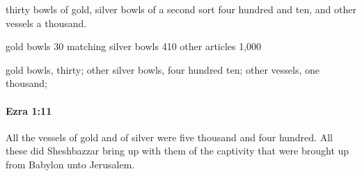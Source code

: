 			\begin{versebox}
					\item[BHS] 
					\item[LXX] 
					\item[ASV] thirty bowls of gold, silver bowls of a second sort four hundred and ten, and other vessels a thousand.
					\item[NIV] gold bowls 30 matching silver bowls 410 other articles 1,000
					\item[NRSV] gold bowls, thirty; other silver bowls, four hundred ten; other vessels, one thousand;
			\end{versebox}

		\paragraph{Ezra 1:11} %
			\label{EZRA-1-11}

			All the vessels of gold and of silver were five thousand and four hundred. All these did Sheshbazzar bring up with them of the captivity that were brought up from Babylon unto Jerusalem.

